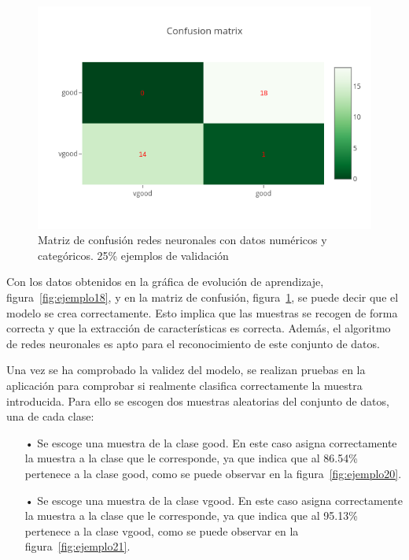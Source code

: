 \documentclass[a4paper, 12pt]{book}
\begin{document}
\begin{figure}
	\centering
	\includegraphics[width=12cm, keepaspectratio]{img/cm_numycat_rn.png}
	\caption{Matriz de confusión redes neuronales con datos numéricos y categóricos. 25\% ejemplos de validación} 	
	\label{fig:ejemplo19}
\end{figure}

 
Con los datos obtenidos en la gráfica de evolución de aprendizaje, figura~\ref{fig:ejemplo18}, y en la matriz de confusión, figura~\ref{fig:ejemplo19}, se puede decir que el modelo se crea correctamente. Esto implica que las muestras se recogen de forma correcta y que la extracción de características es correcta. Además, el algoritmo de redes neuronales es apto para el reconocimiento de este conjunto de datos.

Una vez se ha comprobado la validez del modelo, se realizan pruebas en la aplicación para comprobar si realmente clasifica correctamente la muestra introducida. Para ello se escogen dos muestras aleatorias del conjunto de datos, una de cada clase:

\begin{itemize}
\item[•] Se escoge una muestra de la clase good. En este caso asigna correctamente la muestra a la clase que le corresponde, ya que indica que al 86.54\% pertenece a la clase good, como se puede observar en la figura~\ref{fig:ejemplo20}.
\item[•] Se escoge una muestra de la clase vgood. En este caso asigna correctamente la muestra a la clase que le corresponde, ya que indica que al 95.13\% pertenece a la clase vgood, como se puede observar en la figura~\ref{fig:ejemplo21}. 
\end{itemize}
\end{document}
